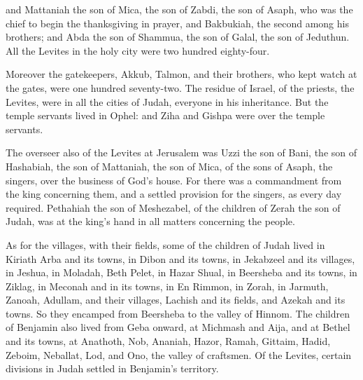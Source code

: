 {and Mattaniah the son of Mica, the son of Zabdi, the son of Asaph, who was the chief to begin the thanksgiving in prayer, and Bakbukiah, the second among his brothers; and Abda the son of Shammua, the son of Galal, the son of Jeduthun.
All the Levites in the holy city were two hundred eighty-four.
\par }{\PP {}Moreover the gatekeepers, Akkub, Talmon, and their brothers, who kept watch at the gates, were one hundred seventy-two.
The residue of Israel, of the priests, the Levites, were in all the cities of Judah, everyone in his inheritance.
But the temple servants lived in Ophel: and Ziha and Gishpa were over the temple servants.
\par }{\PP {}The overseer also of the Levites at Jerusalem was Uzzi the son of Bani, the son of Hashabiah, the son of Mattaniah, the son of Mica, of the sons of Asaph, the singers, over the business of God’s house.
For there was a commandment from the king concerning them, and a settled provision for the singers, as every day required.
Pethahiah the son of Meshezabel, of the children of Zerah the son of Judah, was at the king’s hand in all matters concerning the people.
\par }{\PP {}As for the villages, with their fields, some of the children of Judah lived in Kiriath Arba and its towns, in Dibon and its towns, in Jekabzeel and its villages,
in Jeshua, in Moladah, Beth Pelet,
in Hazar Shual, in Beersheba and its towns,
in Ziklag, in Meconah and in its towns,
in En Rimmon, in Zorah, in Jarmuth,
Zanoah, Adullam, and their villages, Lachish and its fields, and Azekah and its towns. So they encamped from Beersheba to the valley of Hinnom.
The children of Benjamin also lived from Geba onward, at Michmash and Aija, and at Bethel and its towns,
at Anathoth, Nob, Ananiah,
Hazor, Ramah, Gittaim,
Hadid, Zeboim, Neballat,
Lod, and Ono, the valley of craftsmen.
Of the Levites, certain divisions in Judah settled in Benjamin’s territory.

}
